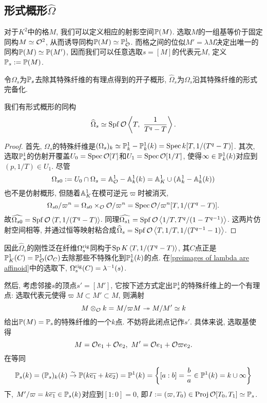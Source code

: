 \subsection{形式概形$\hat{\Omega}$}


对于$K^2$中的格$M$, 我们可以定义相应的射影空间$\P(M)$. 选取$M$的一组基等价于固定同构$M\simeq\O^2$, 从而诱导同构$\P(M)\simeq\P^1_\O$.
而格之间的位似$M' = \lambda M$决定出唯一的同构$\P(M)\simeq\P(M')$, 因而我们可以任意选取$s = [M]$的代表元$M$, 定义$\P_s := \P(M)$.

令$\Omega_s$为$\P_s$去除其特殊纤维的有理点得到的开子概形, $\hat{\Omega}_s$为$\Omega_s$沿其特殊纤维的形式完备化.

\begin{proposition}\label{hatOmega - vertex}
    我们有形式概形的同构\[\hat{\Omega}_s \simeq \spf\O\left<T,\ \frac{1}{T^q - T}\right>.\]
\end{proposition}

\begin{proof}
    首先, $\Omega_s$的特殊纤维是$(\Omega_s)_k\simeq\mathbb{P}_{k}^1-\P_{k}^1(k) = \spec k[T, 1/(T^q-T)]$.
    其次, 选取$\P^1_s$的仿射开覆盖$U_0 = \spec \O[T]$和$U_1 = \spec \O[1/T]$, 使得$\infty\in\P^1_k(k)$对应到$(p, 1/T)\in U_1$.
    尽管\[\Omega_{s0} := U_0\cap \Omega_s = \A^1_\O - \A^1_k(k) = \A^1_K\cup (\A^1_k-\A^1_k(k))\]也不是仿射概形, 但随着$\A^1_K$在模可逆元$\varpi$时被消灭,\[\Omega_{s0}/\varpi^n = \Omega_{s0} \times_\O \O/\varpi^n = \spec \O/\varpi^n[T, 1/(T^q-T)]. \]
    故$\hat{\Omega_{s0}} = \spf \O\left<T, 1/(T^q-T)\right>$. 同理$\hat{\Omega_{s1}} = \spf\O\left<1/T, T^q/(1-T^{q-1})\right>$.
    这两片仿射空间相等, 并通过恒等映射粘合成$\hat{\Omega}_s = \spf\O\left<T, 1/T, 1/(T^{q-1}-1)\right>$.
\end{proof}

因此$\hat{\Omega}_s$的刚性泛在纤维$\Omega_s^{\rig}$同构于$\Sp K\left<T, 1/(T^q-T)\right>$,
其$C$点正是$\P^1_K(C) = \P^1_\O(\O_C)$去除那些不特殊化到$\P^1_k(k)$的点.
在\cref{preimages of lambda are affinoid}\;中的选取下, $\Omega_s^{\rig}(C) = \lambda^{-1}(s)$.

然后, 考虑邻接$s$的顶点$s' = [M']$, 它按下述方式定出$\P^1_s$的特殊纤维上的一个有理点:
选取代表元使得$\varpi M\subset M'\subset M$, 则满射\[M\otimes_\O k = M/\varpi M\surject M/M'\simeq k\]给出$\P(M) = \P_s$的特殊纤维的一个$k$点.
不妨将此闭点记作$s'$.
具体来说, 选取基使得\[M = \O e_1+\O e_2,\ M' = \O e_1 + \O \varpi e_2.\]
在等同\[\P_s(k) = (\P_s)_k(k) \isomto \P(k\bar{e_1}+k\bar{e_2}) = \P^1(k) = \left\{[a : b] = \frac{b}{a}\in \P^1(k) = k\cup{\infty}\right\}\]下,
$M'/\varpi = k\bar{e_1}\in\P_s(k)$对应到$[1 : 0] = 0$, 即$I := (\varpi, T_0)\in\proj\O[T_0, T_1]\simeq\P_s$.

